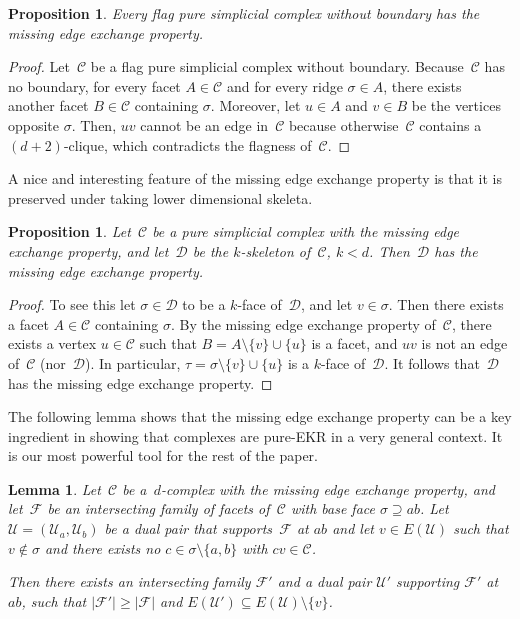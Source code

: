 \documentclass[a4paper,12pt]{amsart}
\theoremstyle{plain}
\newtheorem{proposition}[theorem]{Proposition}
\newtheorem{lemma}[theorem]{Lemma}
\theoremstyle{definition}
\newcommand{\U}{\mathcal U}
\newcommand{\C}{\mathcal C}
\newcommand{\D}{\mathcal D}
\newcommand{\family}{\mathcal F}
\newcommand{\facetA}{A}
\newcommand{\facetB}{B}
\newcommand{\face}{\sigma}
\newcommand{\smallface}{\tau}
\begin{document}
\begin{proposition}
  \label{prop:meep}
  Every flag pure simplicial complex without boundary has the missing edge exchange property.
\end{proposition}

\begin{proof}
  Let~$\C$ be a flag pure simplicial complex without boundary. Because~$\C$ has no boundary, for every facet $\facetA \in \C$ and for every ridge $\face \in \facetA$, there exists another facet $\facetB \in \C$ containing $\face$. Moreover, let $u\in \facetA$ and $v \in \facetB$ be the vertices opposite $\face$. Then, $uv$ cannot be an edge in~$\C$ because otherwise~$\C$ contains a $(d+2)$-clique, which contradicts the flagness of~$\C$.
\end{proof}

A nice and interesting feature of the missing edge exchange property is that it is preserved under taking lower dimensional skeleta.

\begin{proposition}
  \label{prop:meep2}
  Let~$\C$ be a pure simplicial complex with the missing edge exchange property, and let~$\D$ be the $k$-skeleton of~$\C$, $ k < d$. Then~$\D$ has the missing edge exchange property.
\end{proposition}

\begin{proof}
  To see this let $\face \in \D$ to be a $k$-face of~$\D$, and let $v \in \face$. Then there exists a facet $\facetA \in \C$ containing $\face$. By the missing edge exchange property of~$\C$, there exists a vertex $u \in \C$ such that $\facetB = \facetA \setminus \{ v\} \cup \{ u \}$ is a facet, and $uv$ is not an edge of~$\C$ (nor~$\D$). In particular, $\smallface = \face \setminus \{v\} \cup \{u\}$ is a $k$-face of~$\D$. It follows that~$\D$ has the missing edge exchange property.
\end{proof}

The following lemma shows that the missing edge exchange property can be a key ingredient in showing that complexes are pure-EKR in a very general context.
It is our most powerful tool for the rest of the paper. 

\begin{lemma}
\label{lemma_vertex_flip}
Let~$\C$ be a~$d$-complex with the missing edge exchange property, and
let~$\family$ be an intersecting family of facets of~$\C$ with base face $\face \supseteq ab$. Let $\U = (\U_a,\U_b)$ be a dual pair that supports~$\family$ at $ab$ and let $v \in E(\U)$ such that $v\not\in\face$ and there exists no $c\in \face\setminus \{a,b\}$ with $cv\in \C$.

Then there exists an intersecting family $\family'$ and a dual pair $\U'$ supporting $\family'$ at $ab$, such that $|\family'|\geq |\family|$ and $E(\U') \subseteq E(\U)\setminus\{v\}$.
\end{lemma}
\end{document}

